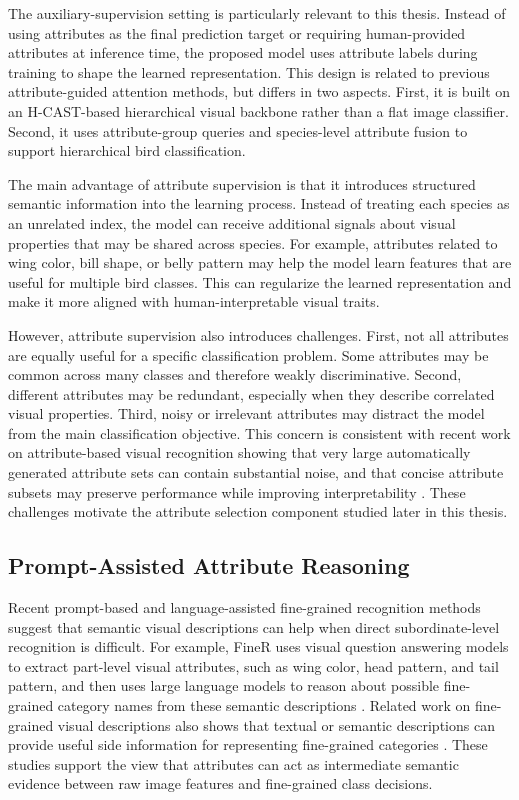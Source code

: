 The auxiliary-supervision setting is particularly relevant to this thesis. Instead of using attributes as the final prediction target or requiring human-provided attributes at inference time, the proposed model uses attribute labels during training to shape the learned representation. This design is related to previous attribute-guided attention methods, but differs in two aspects. First, it is built on an H-CAST-based hierarchical visual backbone rather than a flat image classifier. Second, it uses attribute-group queries and species-level attribute fusion to support hierarchical bird classification.

The main advantage of attribute supervision is that it introduces structured semantic information into the learning process. Instead of treating each species as an unrelated index, the model can receive additional signals about visual properties that may be shared across species. For example, attributes related to wing color, bill shape, or belly pattern may help the model learn features that are useful for multiple bird classes. This can regularize the learned representation and make it more aligned with human-interpretable visual traits.


However, attribute supervision also introduces challenges. First, not all attributes are equally useful for a specific classification problem. Some attributes may be common across many classes and therefore weakly discriminative. Second, different attributes may be redundant, especially when they describe correlated visual properties. Third, noisy or irrelevant attributes may distract the model from the main classification objective. This concern is consistent with recent work on attribute-based visual recognition showing that very large automatically generated attribute sets can contain substantial noise, and that concise attribute subsets may preserve performance while improving interpretability \cite{yan2023learning}. These challenges motivate the attribute selection component studied later in this thesis.



\subsection{Prompt-Assisted Attribute Reasoning}

Recent prompt-based and language-assisted fine-grained recognition methods suggest that semantic visual descriptions can help when direct subordinate-level recognition is difficult. For example, FineR uses visual question answering models to extract part-level visual attributes, such as wing color, head pattern, and tail pattern, and then uses large language models to reason about possible fine-grained category names from these semantic descriptions \cite{liu2024democratizing}. Related work on fine-grained visual descriptions also shows that textual or semantic descriptions can provide useful side information for representing fine-grained categories \cite{reed2016learning}. These studies support the view that attributes can act as intermediate semantic evidence between raw image features and fine-grained class decisions.

